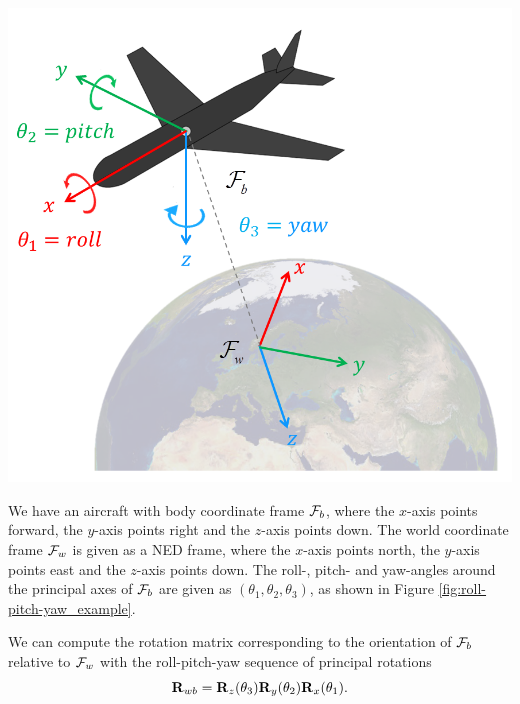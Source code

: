 \begin{example}[frametitle={Orientation represented as roll, pitch and yaw}]
{
  \centering
  \includegraphics[width=0.5\columnwidth]{figures/roll-pitch-yaw_NED.png}
  \captionsetup{type=figure}
  \label{fig:roll-pitch-yaw_example}
  \par
}

We have an aircraft with body coordinate frame $\mathcal{F}_b$, where the $x$-axis points forward, the $y$-axis points right and the $z$-axis points down.
The world coordinate frame $\mathcal{F}_w$ is given as a NED frame, where the $x$-axis points north, the $y$-axis points east and the $z$-axis points down.
The roll-, pitch- and yaw-angles around the principal axes of $\mathcal{F}_b$ are given as $(\theta_1, \theta_2, \theta_3)$, as shown in Figure \ref{fig:roll-pitch-yaw_example}.

We can compute the rotation matrix corresponding to the orientation of $\mathcal{F}_b$ relative to $\mathcal{F}_w$ with the roll-pitch-yaw sequence of principal rotations
\begin{equation}
  {\boldsymbol{\mathbf{R}}}_{wb} = {\boldsymbol{\mathbf{R}}}_z(\theta_3) {\boldsymbol{\mathbf{R}}}_y(\theta_2) {\boldsymbol{\mathbf{R}}}_x(\theta_1).
\end{equation}
\end{example}

